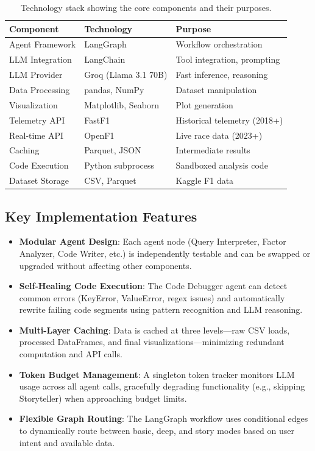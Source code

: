 \documentclass[11pt]{article}
\begin{document}
\begin{table}[h!]
\centering
\begin{tabular}{lll}
\hline
\textbf{Component} & \textbf{Technology} & \textbf{Purpose} \\
\hline
Agent Framework & LangGraph & Workflow orchestration \\
LLM Integration & LangChain & Tool integration, prompting \\
LLM Provider & Groq (Llama 3.1 70B) & Fast inference, reasoning \\
Data Processing & pandas, NumPy & Dataset manipulation \\
Visualization & Matplotlib, Seaborn & Plot generation \\
Telemetry API & FastF1 & Historical telemetry (2018+) \\
Real-time API & OpenF1 & Live race data (2023+) \\
Caching & Parquet, JSON & Intermediate results \\
Code Execution & Python subprocess & Sandboxed analysis code \\
Dataset Storage & CSV, Parquet & Kaggle F1 data \\
\hline
\end{tabular}
\caption{Technology stack showing the core components and their purposes.}
\label{tab:tech-stack}
\end{table}

\subsection{Key Implementation Features}

\begin{itemize}[leftmargin=1.5em]
    \item \textbf{Modular Agent Design}: Each agent node (Query Interpreter, Factor Analyzer, Code Writer, etc.) is independently testable and can be swapped or upgraded without affecting other components.
    \item \textbf{Self-Healing Code Execution}: The Code Debugger agent can detect common errors (KeyError, ValueError, regex issues) and automatically rewrite failing code segments using pattern recognition and LLM reasoning.
    \item \textbf{Multi-Layer Caching}: Data is cached at three levels—raw CSV loads, processed DataFrames, and final visualizations—minimizing redundant computation and API calls.
    \item \textbf{Token Budget Management}: A singleton token tracker monitors LLM usage across all agent calls, gracefully degrading functionality (e.g., skipping Storyteller) when approaching budget limits.
    \item \textbf{Flexible Graph Routing}: The LangGraph workflow uses conditional edges to dynamically route between basic, deep, and story modes based on user intent and available data.
\end{itemize}
\end{document}
